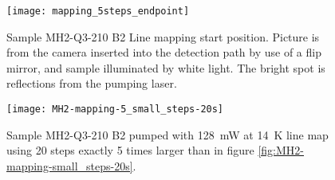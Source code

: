 \begin{figure}[H]
\centering
\texttt{[image: mapping\_5steps\_endpoint]}
\caption[MH2-Q3-210 line mapping start position]{Sample MH2-Q3-210 B2 Line mapping start position. Picture is from the camera inserted into the detection path by use of a flip mirror, and sample illuminated by white light. The bright spot is reflections from the pumping laser.}
\label{fig:mapping_5steps_endpoint}%
\end{figure}

\begin{figure}[H]
\centering
\texttt{[image: MH2-mapping-5\_small\_steps-20s]}
\caption[MH2-Q3-210 line mapping]{Sample MH2-Q3-210 B2 pumped with 128~mW at 14~K line map using 20 steps exactly 5 times larger than in figure \ref{fig:MH2-mapping-small_steps-20s}.}
\label{fig:MH2-mapping-5_small_steps-20s}%
\end{figure}


